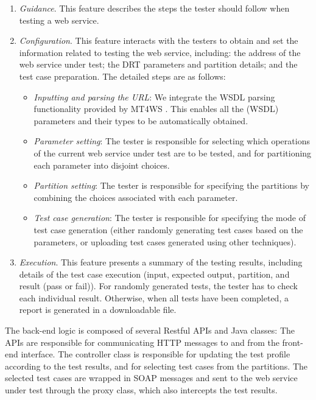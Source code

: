 \documentclass[10pt,journal,compsoc]{IEEEtran}
\begin{document}
\begin{enumerate}[1)]
  \item
  \emph{Guidance}. This feature describes the steps the tester should follow when testing a web service.

  \item
  \emph{Configuration}. This feature interacts with the testers to obtain and set the information related to testing the web service, including: the address of the web service under test; the DRT parameters and partition details; and the test case preparation. The detailed steps are as follows:

  \begin{itemize}
    \item
    \emph{Inputting and parsing the URL}: We integrate the WSDL parsing functionality provided by MT4WS \cite{sun2016mt4ws}. This enables all the (WSDL) parameters and their types to be automatically obtained.
    \item
    \emph{Parameter setting}: The tester is responsible for selecting which operations of the current web service under test are to be tested, and for partitioning each parameter into disjoint choices.
    \item
    \emph{Partition setting}: The tester is responsible for specifying the partitions by combining the choices associated with each parameter.
    \item
    \emph{Test case generation}: The tester is responsible for specifying the mode of test case generation (either randomly generating test cases based on the parameters, or uploading test cases generated using other techniques).
  \end{itemize}
  \item
  \emph{Execution}. This feature presents a summary of the testing results, including details of the test case execution (input, expected output, partition, and result (pass or fail)). For randomly generated tests, the tester has to check each individual result. Otherwise, when all tests have been completed, a report is generated in a downloadable file.
\end{enumerate}

The back-end logic is composed of several Restful APIs and Java classes: The APIs are responsible for communicating HTTP messages to and from the front-end interface. The controller class is responsible for updating the test profile according to the test results, and for selecting test cases from the partitions. The selected test cases are wrapped in SOAP messages and sent to the web service under test through the proxy class, which also intercepts the test results.
\end{document}
